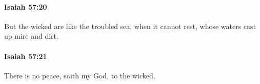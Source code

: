 		\paragraph{Isaiah 57:20} %
			\label{ISAIAH-57-20}

			But the wicked are like the troubled sea, when it cannot rest, whose waters cast up mire and dirt.


		\paragraph{Isaiah 57:21} %
			\label{ISAIAH-57-21}

			There is no peace, saith my God, to the wicked.

